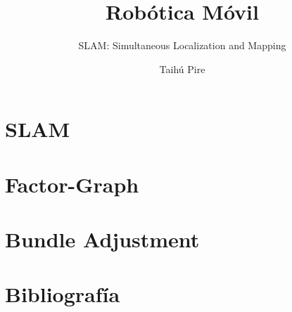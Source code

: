 \documentclass[aspectratio=169,compress]{beamer}
\subtitle{SLAM: Simultaneous Localization and Mapping}
\title{Robótica Móvil}
\author{Taihú Pire}
\institute{Laboratorio de Robótica}
\date{}
\begin{document}
	
	\frame{\titlepage}
	
	\section{SLAM}
	

	\section{Factor-Graph}
	
    
    \section{Bundle Adjustment}
    
	
	\section{Bibliografía}
	
	
\end{document}
